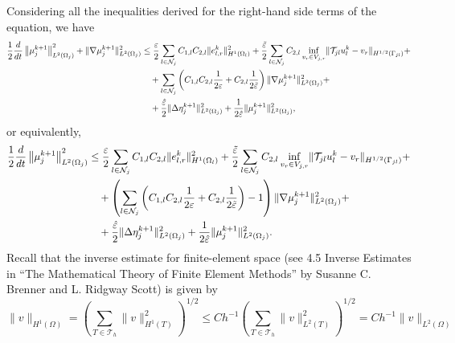 \documentclass[a4paper, 11pt]{article}
\theoremstyle{plain}
\theoremstyle{definition}
\theoremstyle{remark}
\begin{document}
Considering all the inequalities derived for the right-hand side terms of the equation, we have
\begin{align*}
    \dfrac{1}{2}\dfrac{d}{dt}\left\lVert \mu_{j}^{k+1}\right\rVert^{2}_{L^{2}(\Omega_{j})} + \lVert \nabla \mu_{j}^{k+1}\rVert^{2}_{L^{2}(\Omega_{j})} &\leq \dfrac{\varepsilon}{2}\sum_{l\in \mathcal{N}_{j}}C_{1, l}C_{2, l}\lVert e_{l, r}^{k} \rVert^{2}_{H^{1}(\Omega_{l})} + \dfrac{\Tilde{\varepsilon}}{2}\sum_{l\in \mathcal{N}_{j}}C_{2, l}\inf_{v_{r}\in V_{j, r}}\lVert \mathcal{T}_{jl}u_{l}^{k} -  v_{r} \rVert_{H^{1/2}(\Gamma_{jl})}+\\
    &\quad + \sum_{l\in \mathcal{N}_{j}}\left(C_{1, l}C_{2, l}\dfrac{1}{2\varepsilon} + C_{2, l}\dfrac{1}{2\Tilde{\varepsilon}}\right)\lVert \nabla\mu_{j}^{k+1} \rVert^{2}_{L^{2}(\Omega_{j})}+\\
    &\quad + \dfrac{\hat{\varepsilon}}{2}\lVert \Delta\eta_{j}^{k+1} \rVert^{2}_{L^{2}(\Omega_{j})} + \dfrac{1}{2\hat{\varepsilon}}\lVert \mu_{j}^{k+1} \rVert^{2}_{L^{2}(\Omega_{j})},
\end{align*}
or equivalently,
\begin{align*}
    \dfrac{1}{2}\dfrac{d}{dt}\left\lVert \mu_{j}^{k+1}\right\rVert^{2}_{L^{2}(\Omega_{j})} &\leq \dfrac{\varepsilon}{2}\sum_{l\in \mathcal{N}_{j}}C_{1, l}C_{2, l}\lVert e_{l, r}^{k} \rVert^{2}_{H^{1}(\Omega_{l})} + \dfrac{\Tilde{\varepsilon}}{2}\sum_{l\in \mathcal{N}_{j}}C_{2, l}\inf_{v_{r}\in V_{j, r}}\lVert \mathcal{T}_{jl}u_{l}^{k} -  v_{r} \rVert_{H^{1/2}(\Gamma_{jl})}+\\
    &\quad + \left(\sum_{l\in \mathcal{N}_{j}}\left(C_{1, l}C_{2, l}\dfrac{1}{2\varepsilon} + C_{2, l}\dfrac{1}{2\Tilde{\varepsilon}}\right) - 1\right
    )\lVert \nabla\mu_{j}^{k+1} \rVert^{2}_{L^{2}(\Omega_{j})}+\\
    &\quad + \dfrac{\hat{\varepsilon}}{2}\lVert \Delta\eta_{j}^{k+1} \rVert^{2}_{L^{2}(\Omega_{j})} + \dfrac{1}{2\hat{\varepsilon}}\lVert \mu_{j}^{k+1} \rVert^{2}_{L^{2}(\Omega_{j})}.
\end{align*}
Recall that the inverse estimate for finite-element space (see 4.5 Inverse Estimates in “The Mathematical Theory of Finite Element Methods” by Susanne C. Brenner and L. Ridgway Scott) is given by
\begin{equation*}
    \lVert v \rVert_{H^{1}(\Omega)} = \left(\sum_{T\in \mathcal{T}_{h}}\lVert v \rVert^{2}_{H^{1}(T)}\right)^{1/2} \leq Ch^{-1}\left(\sum_{T\in \mathcal{T}_{h}}\lVert v \rVert^{2}_{L^{2}(T)}\right)^{1/2} = Ch^{-1}\lVert v \rVert_{L^{2}(\Omega)}
\end{equation*}
\end{document}
